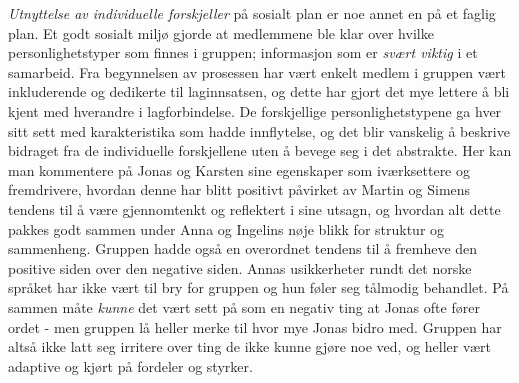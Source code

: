 \emph{Utnyttelse av individuelle forskjeller} på sosialt plan er noe annet en på et faglig plan. Et godt sosialt miljø gjorde at medlemmene ble klar over hvilke personlighetstyper som finnes i gruppen; informasjon som er \emph{svært viktig} i et samarbeid. Fra begynnelsen av prosessen har vært enkelt medlem i gruppen vært inkluderende og dedikerte til laginnsatsen, og dette har gjort det mye lettere å bli kjent med hverandre i lagforbindelse. De forskjellige personlighetstypene ga hver sitt sett med karakteristika som hadde innflytelse, og det blir vanskelig å beskrive bidraget fra de individuelle forskjellene uten å bevege seg i det abstrakte. Her kan man kommentere på Jonas og Karsten sine egenskaper som iværksettere og fremdrivere, hvordan denne har blitt positivt påvirket av Martin og Simens tendens til å være gjennomtenkt og reflektert i sine utsagn, og hvordan alt dette pakkes godt sammen under Anna og Ingelins nøje blikk for struktur og sammenheng. Gruppen hadde også en overordnet tendens til å fremheve den positive siden over den negative siden. Annas usikkerheter rundt det norske språket har ikke vært til bry for gruppen og hun føler seg tålmodig behandlet. På sammen måte \emph{kunne} det vært sett på som en negativ ting at Jonas ofte fører ordet - men gruppen lå heller merke til hvor mye Jonas bidro med. Gruppen har altså ikke latt seg irritere over ting de ikke kunne gjøre noe ved, og heller vært adaptive og kjørt på fordeler og styrker. 